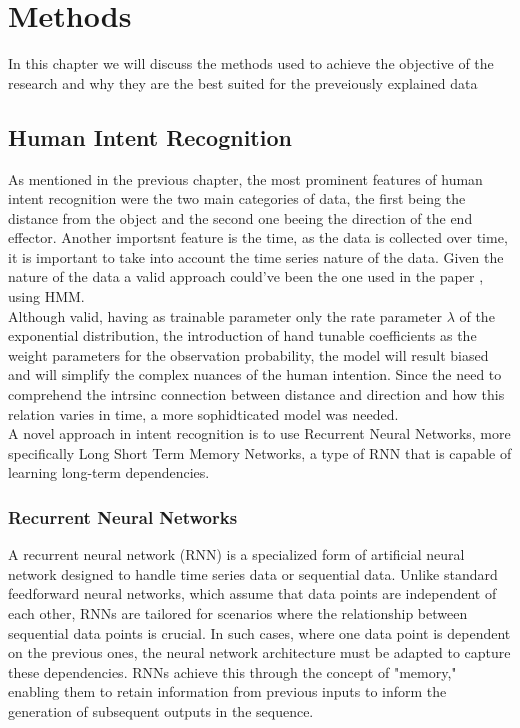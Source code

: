 \chapter{Methods} %
In this chapter we will discuss the methods used to achieve the objective of the research and why they are the best suited for the preveiously explained data  

\label{Chapter4}


\section {Human Intent Recognition}
As mentioned in the previous chapter, the most prominent features of human intent recognition were the two main categories of data, the first being the distance from the object and the second one beeing the direction of the end effector.
Another importsnt feature is the time, as the data is collected over time, it is important to take into account the time series nature of the data.
Given the nature of the data a valid approach could've been the one used in the paper , using HMM.\\
Although valid, having as trainable parameter only the rate parameter $\lambda$ of the exponential distribution, the introduction of hand tunable coefficients as the weight parameters for the observation probability, the model will result biased and will simplify the complex nuances of the human intention.
Since the need to comprehend the intrsinc connection between distance and direction and how this relation varies in time, a more sophidticated model was needed.\\
A novel approach in intent recognition is to use Recurrent Neural Networks, more specifically Long Short Term Memory Networks, a type of RNN that is capable of learning long-term dependencies.

\subsection{Recurrent Neural Networks}

A recurrent neural network (RNN) is a specialized form of artificial neural network designed to handle time series data or sequential data. 
Unlike standard feedforward neural networks, which assume that data points are independent of each other, RNNs are tailored for scenarios where the relationship between sequential data points is crucial. 
In such cases, where one data point is dependent on the previous ones, the neural network architecture must be adapted to capture these dependencies. 
RNNs achieve this through the concept of "memory," enabling them to retain information from previous inputs to inform the generation of subsequent outputs in the sequence.

